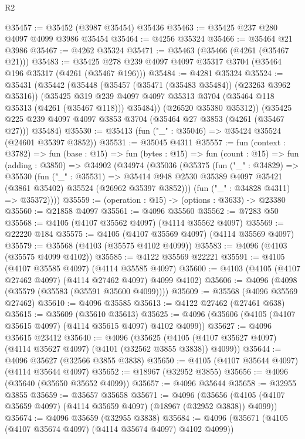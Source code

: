 \begin{lexlean}{R2}
\begin{coremodule}
@35457 := @35452 (@3987 @35454) @35436
@35463 := @35425 @237 @280 @4097 @4099 @3986 @35454
@35464 := @4256 @35324
@35466 := @35464 @21 @3986
@35467 := @4262 @35324
@35471 := @35463 (@35466 (@4261 (@35467 @21)))
@35483 := @35425 @278 @239 @4097 @4097 @35317 @3704 (@35464 @196 @35317 (@4261 (@35467 @196)))
@35484 := @4281 @35324
@35524 := @35431
    (@35442
      (@35448
        (@35457 (@35471 (@35483 @35484)) (@23263 @3962 @35316))
        (@35425
          @319
          @239
          @4097
          @4097
          @35313
          @3704
          (@35464 @118 @35313 (@4261 (@35467 @118)))
          @35484))
      (@26520 @35380 @35312))
    (@35425 @225 @239 @4097 @4097 @3853 @3704 (@35464 @27 @3853 (@4261 (@35467 @27))) @35484)
@35530 := @35413 (fun ("_" : @35046) => @35424 @35524 (@24601 @35397 @3852))
@35531 := @35045 @4311
@35557 := fun (context : @3782) =>
  fun (base : @15) =>
  fun (bytes : @15) =>
  fun (count : @15) =>
  fun (adding : @3850) =>
  @34902
    (@34974
      (@35036
        (@35375
          (fun ("_" : @34829) =>
          @35530
            (fun ("_" : @35531) =>
            @35414 @948 @2530 @35389 @4097 @35421 (@3861 @35402) @35524 (@26962 @35397 @3852)))
          (fun ("_" : @34828 @4311) => @35372))))
@35559 := (operation : @15) -> (options : @3633) -> @23380
@35560 := @21858 @4097
@35561 := @4096 @35560
@35562 := @7283 @50
@35568 := @4105 (@4107 @35562 @4097) (@4114 @35562 @4097)
@35569 := @22220 @184
@35575 := @4105 (@4107 @35569 @4097) (@4114 @35569 @4097)
@35579 := @35568 (@4103 (@35575 @4102 @4099))
@35583 := @4096 (@4103 (@35575 @4099 @4102))
@35585 := @4122 @35569 @22221
@35591 := @4105 (@4107 @35585 @4097) (@4114 @35585 @4097)
@35600 := @4103 (@4105 (@4107 @27462 @4097) (@4114 @27462 @4097) @4099 @4102)
@35606 := @4096 (@4098 (@35579 (@35583 (@35591 @35600 @4099))))
@35609 := @35568 (@4096 @35569 @27462)
@35610 := @4096 @35585
@35613 := @4122 @27462 (@27461 @638)
@35615 := @35609 (@35610 @35613)
@35625 := @4096 (@35606 (@4105 (@4107 @35615 @4097) (@4114 @35615 @4097) @4102 @4099))
@35627 := @4096 @35615 @23412
@35640 := @4096
    (@35625 (@4105 (@4107 @35627 @4097) (@4114 @35627 @4097) (@4101 (@32562 @3855 @3838)) @4099))
@35644 := @4096 @35627 (@32566 @3855 @3838)
@35650 := @4105 (@4107 @35644 @4097) (@4114 @35644 @4097)
@35652 := @18967 (@32952 @3855)
@35656 := @4096 (@35640 (@35650 @35652 @4099))
@35657 := @4096 @35644
@35658 := @32955 @3855
@35659 := @35657 @35658
@35671 := @4096
    (@35656 (@4105 (@4107 @35659 @4097) (@4114 @35659 @4097) (@18967 (@32952 @3838)) @4099))
@35674 := @4096 @35659 (@32955 @3838)
@35684 := @4096 (@35671 (@4105 (@4107 @35674 @4097) (@4114 @35674 @4097) @4102 @4099))

\end{coremodule}
\end{lexlean}
